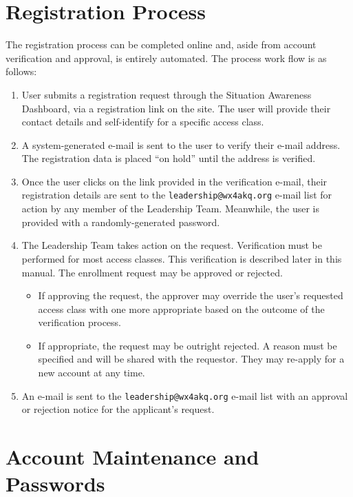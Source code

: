 \documentclass[pdflatex,letterpaper,twoside,12pt]{book}
\begin{document}

\section{Registration Process}

The registration process can be completed online and, aside from account verification and approval, is entirely automated.  The process work flow is as follows:

\begin{enumerate}
\item User submits a registration request through the Situation Awareness Dashboard, via a registration link on the site.  The user will provide their contact details and self-identify for a specific access class.
\item A system-generated e-mail is sent to the user to verify their e-mail address.  The registration data is placed ``on hold'' until the address is verified.
\item Once the user clicks on the link provided in the verification e-mail, their registration details are sent to the \verb|leadership@wx4akq.org| e-mail list for action by any member of the Leadership Team.  Meanwhile, the user is provided with a randomly-generated password.
\item The Leadership Team takes action on the request.  Verification must be performed for most access classes.  This verification is described later in this manual.  The enrollment request may be approved or rejected.
\begin{itemize}
  \item If approving the request, the approver may override the user's requested access class with one more appropriate based on the outcome of the verification process.
  \item If appropriate, the request may be outright rejected.  A reason must be specified and will be shared with the requestor.  They may re-apply for a new account at any time.
  \end{itemize}
\item An e-mail is sent to the \verb|leadership@wx4akq.org| e-mail list with an approval or rejection notice for the applicant's request.
\end{enumerate}


\section{Account Maintenance and Passwords}
\end{document}
